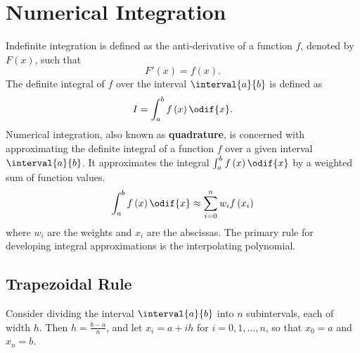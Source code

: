 \documentclass{article}
\begin{document}
\section{Numerical Integration}
Indefinite integration is defined as the anti-derivative of a function \(f\), denoted by \(F\left( x \right)\),
such that
\begin{equation*}
    F'\left( x \right) = f\left( x \right).
\end{equation*}
The definite integral of \(f\) over the interval \(\interval{a}{b}\) is defined as
\begin{equation*}
    I = \int_a^b f\left( x \right) \odif{x}.
\end{equation*}
Numerical integration, also known as \textbf{quadrature}, is concerned with approximating the definite integral of a function \(f\) over a given interval \(\interval{a}{b}\).
It approximates the integral \(\int_a^b f\left( x \right) \odif{x}\) by a weighted sum of function values.
\begin{equation*}
    \int_a^b f\left( x \right) \odif{x} \approx \sum_{i = 0}^n w_i f\left( x_i \right)
\end{equation*}
where \(w_i\) are the weights and \(x_i\) are the abscissas. The primary rule for developing integral approximations is the interpolating polynomial.
\subsection{Trapezoidal Rule}
Consider dividing the interval \(\interval{a}{b}\) into \(n\) subintervals, each of width \(h\). Then \(h = \frac{b - a}{n}\),
and let \(x_i = a + ih\) for \(i = 0, 1, \ldots, n\), so that \(x_0 = a\) and \(x_n = b\).
\end{document}
